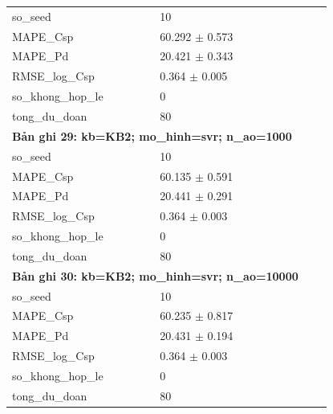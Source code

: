 \begin{longtable}{p{0.43\linewidth}p{0.50\linewidth}}
so\_\allowbreak seed & 10 \\
MAPE\_\allowbreak Csp & 60.292 $\pm$ 0.573 \\
MAPE\_\allowbreak Pd & 20.421 $\pm$ 0.343 \\
RMSE\_\allowbreak log\_\allowbreak Csp & 0.364 $\pm$ 0.005 \\
so\_\allowbreak khong\_\allowbreak hop\_\allowbreak le & 0 \\
tong\_\allowbreak du\_\allowbreak doan & 80 \\
\midrule
\multicolumn{2}{p{0.95\linewidth}}{\textbf{Bản ghi 29: kb=KB2; mo\_hinh=svr; n\_ao=1000}} \\
so\_\allowbreak seed & 10 \\
MAPE\_\allowbreak Csp & 60.135 $\pm$ 0.591 \\
MAPE\_\allowbreak Pd & 20.441 $\pm$ 0.291 \\
RMSE\_\allowbreak log\_\allowbreak Csp & 0.364 $\pm$ 0.003 \\
so\_\allowbreak khong\_\allowbreak hop\_\allowbreak le & 0 \\
tong\_\allowbreak du\_\allowbreak doan & 80 \\
\midrule
\multicolumn{2}{p{0.95\linewidth}}{\textbf{Bản ghi 30: kb=KB2; mo\_hinh=svr; n\_ao=10000}} \\
so\_\allowbreak seed & 10 \\
MAPE\_\allowbreak Csp & 60.235 $\pm$ 0.817 \\
MAPE\_\allowbreak Pd & 20.431 $\pm$ 0.194 \\
RMSE\_\allowbreak log\_\allowbreak Csp & 0.364 $\pm$ 0.003 \\
so\_\allowbreak khong\_\allowbreak hop\_\allowbreak le & 0 \\
tong\_\allowbreak du\_\allowbreak doan & 80 \\
\midrule
\bottomrule
\end{longtable}
